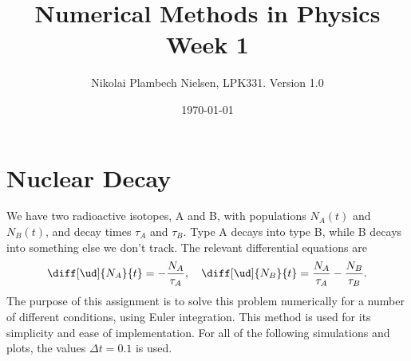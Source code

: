 \documentclass[a4paper,10pt]{article} 	%
\title{Numerical Methods in Physics Week 1}
\author{Nikolai Plambech Nielsen, LPK331. Version 1.0}
\date{\today}
\numberwithin{equation}{section}
\begin{document}
	\maketitle
	\section{Nuclear Decay}
	We have two radioactive isotopes, A and B, with populations $ N_A(t) $ and $ N_B(t) $, and decay times $ \tau_A $  and $ \tau_B $. Type A decays into type B, while B decays into something else we don't track. The relevant differential equations are
	\begin{equation}\label{key}
		\diff[\ud]{N_A}{t} = - \frac{N_A}{\tau_A}, \quad \diff[\ud]{N_B}{t} = \frac{N_A}{\tau_A} - \frac{N_B}{\tau_B}.
	\end{equation}
	The purpose of this assignment is to solve this problem numerically for a number of different conditions, using Euler integration. This method is used for its simplicity and ease of implementation. For all of the following simulations and plots, the values $ \Delta t = 0.1 $ is used.
	
\end{document}
